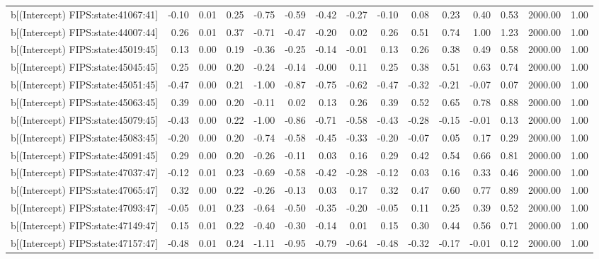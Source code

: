 \begin{table}[ht]
\begin{tabular}{rrrrrrrrrrrrrrr}
  b[(Intercept) FIPS:state:41067:41] & -0.10 & 0.01 & 0.25 & -0.75 & -0.59 & -0.42 & -0.27 & -0.10 & 0.08 & 0.23 & 0.40 & 0.53 & 2000.00 & 1.00 \\ 
  b[(Intercept) FIPS:state:44007:44] & 0.26 & 0.01 & 0.37 & -0.71 & -0.47 & -0.20 & 0.02 & 0.26 & 0.51 & 0.74 & 1.00 & 1.23 & 2000.00 & 1.00 \\ 
  b[(Intercept) FIPS:state:45019:45] & 0.13 & 0.00 & 0.19 & -0.36 & -0.25 & -0.14 & -0.01 & 0.13 & 0.26 & 0.38 & 0.49 & 0.58 & 2000.00 & 1.00 \\ 
  b[(Intercept) FIPS:state:45045:45] & 0.25 & 0.00 & 0.20 & -0.24 & -0.14 & -0.00 & 0.11 & 0.25 & 0.38 & 0.51 & 0.63 & 0.74 & 2000.00 & 1.00 \\ 
  b[(Intercept) FIPS:state:45051:45] & -0.47 & 0.00 & 0.21 & -1.00 & -0.87 & -0.75 & -0.62 & -0.47 & -0.32 & -0.21 & -0.07 & 0.07 & 2000.00 & 1.00 \\ 
  b[(Intercept) FIPS:state:45063:45] & 0.39 & 0.00 & 0.20 & -0.11 & 0.02 & 0.13 & 0.26 & 0.39 & 0.52 & 0.65 & 0.78 & 0.88 & 2000.00 & 1.00 \\ 
  b[(Intercept) FIPS:state:45079:45] & -0.43 & 0.00 & 0.22 & -1.00 & -0.86 & -0.71 & -0.58 & -0.43 & -0.28 & -0.15 & -0.01 & 0.13 & 2000.00 & 1.00 \\ 
  b[(Intercept) FIPS:state:45083:45] & -0.20 & 0.00 & 0.20 & -0.74 & -0.58 & -0.45 & -0.33 & -0.20 & -0.07 & 0.05 & 0.17 & 0.29 & 2000.00 & 1.00 \\ 
  b[(Intercept) FIPS:state:45091:45] & 0.29 & 0.00 & 0.20 & -0.26 & -0.11 & 0.03 & 0.16 & 0.29 & 0.42 & 0.54 & 0.66 & 0.81 & 2000.00 & 1.00 \\ 
  b[(Intercept) FIPS:state:47037:47] & -0.12 & 0.01 & 0.23 & -0.69 & -0.58 & -0.42 & -0.28 & -0.12 & 0.03 & 0.16 & 0.33 & 0.46 & 2000.00 & 1.00 \\ 
  b[(Intercept) FIPS:state:47065:47] & 0.32 & 0.00 & 0.22 & -0.26 & -0.13 & 0.03 & 0.17 & 0.32 & 0.47 & 0.60 & 0.77 & 0.89 & 2000.00 & 1.00 \\ 
  b[(Intercept) FIPS:state:47093:47] & -0.05 & 0.01 & 0.23 & -0.64 & -0.50 & -0.35 & -0.20 & -0.05 & 0.11 & 0.25 & 0.39 & 0.52 & 2000.00 & 1.00 \\ 
  b[(Intercept) FIPS:state:47149:47] & 0.15 & 0.01 & 0.22 & -0.40 & -0.30 & -0.14 & 0.01 & 0.15 & 0.30 & 0.44 & 0.56 & 0.71 & 2000.00 & 1.00 \\ 
  b[(Intercept) FIPS:state:47157:47] & -0.48 & 0.01 & 0.24 & -1.11 & -0.95 & -0.79 & -0.64 & -0.48 & -0.32 & -0.17 & -0.01 & 0.12 & 2000.00 & 1.00 \\ 

\end{tabular}
\end{table}
